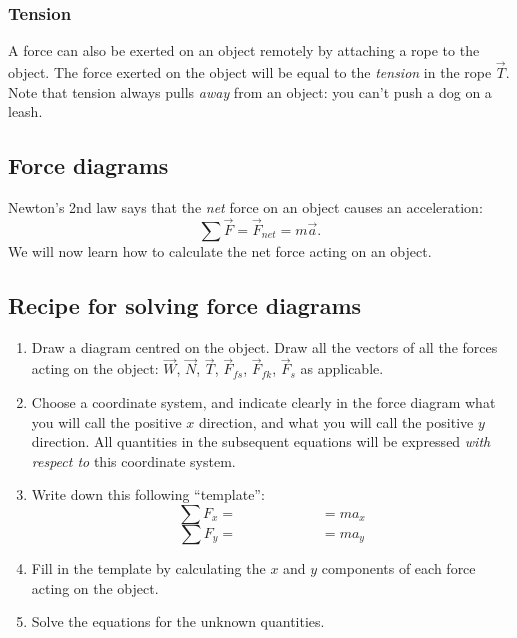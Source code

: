 \documentclass[letterpaper,9pt,journal]{IEEEtran}
\newcommand{\dokuitalic}[1]{\textsl{#1}}
\newcommand{\dokuitem}{\item}
\newcommand{\be}{\begin{equation}}
\newcommand{\ee}{\end{equation}}
\begin{document}
\subsubsection{Tension}
A force can also be exerted on an object remotely by attaching a rope to the object.
The force exerted on the object will be equal to the \emph{tension} in the rope $\vec{T}$.
Note that tension always pulls \dokuitalic{away} from an object:  you can't push a dog on a leash.


\vspace{-3mm}
\subsection{Force diagrams}



Newton's 2nd law says that the \dokuitalic{net} force on an object causes an acceleration:
\be
 \sum \vec{F}=\vec{F}_{net} = m\vec{a}.
 \label{FeqMA}
\ee
We will now learn how to calculate the net force acting on an object.

\vspace{-3mm}
\subsection{Recipe for solving force diagrams}
\label{31bb2b3f8fca76563afa16cf8fbccb90}%

\begin{enumerate}
\dokuitem  Draw a diagram centred on the object. Draw all the vectors of all the forces acting on the object:
    $\vec{W}$, $\vec{N}$, $\vec{T}$, $\vec{F}_{fs}$, $\vec{F}_{fk}$,
    $\vec{F}_{s}$ as applicable.
\dokuitem  Choose a coordinate system, and indicate clearly in the force diagram what you will call the positive $x$ direction, 
and what you will call the positive $y$ direction. All quantities in the subsequent equations will be expressed \emph{with respect to} this coordinate system.
\dokuitem  Write down this following ``template'': \[ \sum F_x = \qquad \qquad \qquad = ma_x \]   \[ \sum F_y = \qquad \qquad \qquad = ma_y \]
\dokuitem   Fill in the template by calculating the $x$ and $y$ components of each force acting on the object.
\dokuitem  Solve the equations for the unknown quantities.
\end{enumerate}
\end{document}
